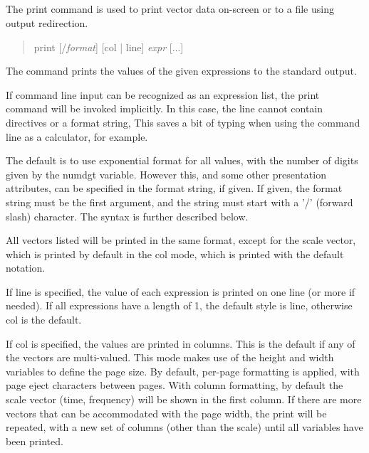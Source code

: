 \subsection{}
\label{print}


The {\cb print} command is used to print vector data on-screen or
to a file using output redirection.
\begin{quote}\vt
print [/{\it format\/}] [col | line] {\it expr\/} [...]
\end{quote}
The command prints the values of the given expressions to the standard
output.

If command line input can be recognized as an expression list, the
print command will be invoked implicitly.  In this case, the line
cannot contain directives or a format string, This saves a bit of
typing when using the {\WRspice} command line as a calculator, for
example.

The default is to use exponential format for all values, with the
number of digits given by the {\et numdgt} variable.  However this,
and some other presentation attributes, can be specified in the format
string, if given.  If given, the format string must be the first
argument, and the string must start with a '/' (forward slash)
character.  The syntax is further described below.

All vectors listed will be printed in the same format, except for the
scale vector, which is printed by default in the {\vt col} mode, which
is printed with the default notation.

If {\vt line} is specified, the value of each expression is printed on
one line (or more if needed).  If all expressions have a length of 1,
the default style is {\vt line}, otherwise {\vt col} is the default.

If {\vt col} is specified, the values are printed in columns.  This is
the default if any of the vectors are multi-valued.  This mode makes
use of the {\vt height} and {\vt width} variables to define the page
size.  By default, per-page formatting is applied, with page eject
characters between pages.  With column formatting, by default the
scale vector ({\et time}, {\et frequency}) will be shown in the first
column.  If there are more vectors that can be accommodated with the
page width, the print will be repeated, with a new set of columns
(other than the scale) until all variables have been printed.

